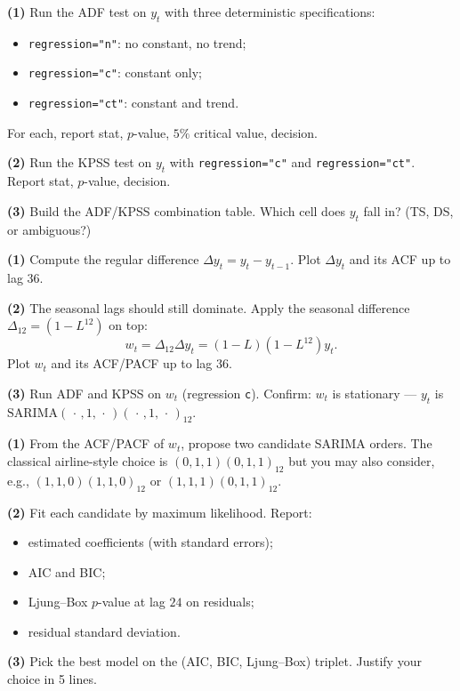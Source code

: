 \documentclass[a4paper,11pt]{article}
\begin{document}
\begin{exercise}
\textbf{(1)} Run the ADF test on $y_t$ with three deterministic
specifications:
\begin{itemize}
  \item \texttt{regression="n"}: no constant, no trend;
  \item \texttt{regression="c"}: constant only;
  \item \texttt{regression="ct"}: constant and trend.
\end{itemize}
For each, report stat, $p$-value, $5\%$ critical value, decision.

\textbf{(2)} Run the KPSS test on $y_t$ with \texttt{regression="c"}
and \texttt{regression="ct"}. Report stat, $p$-value, decision.

\textbf{(3)} Build the ADF/KPSS combination table. Which cell does
$y_t$ fall in? (TS, DS, or ambiguous?)
\end{exercise}

\begin{exercise}[Differencing]
\textbf{(1)} Compute the regular difference $\Delta y_t = y_t -
y_{t-1}$. Plot $\Delta y_t$ and its ACF up to lag $36$.

\textbf{(2)} The seasonal lags should still dominate. Apply the
seasonal difference $\Delta_{12} = (1 - L^{12})$ on top:
\[
  w_t = \Delta_{12} \Delta y_t = (1 - L)(1 - L^{12}) y_t.
\]
Plot $w_t$ and its ACF/PACF up to lag $36$.

\textbf{(3)} Run ADF and KPSS on $w_t$ (regression \texttt{c}).
Confirm: $w_t$ is stationary --- $y_t$ is $\text{SARIMA}(\,\cdot\,,1,\,\cdot\,)
(\,\cdot\,,1,\,\cdot\,)_{12}$.
\end{exercise}

\begin{exercise}
\textbf{(1)} From the ACF/PACF of $w_t$, propose two candidate
SARIMA orders. The classical airline-style choice is
$(0,1,1)(0,1,1)_{12}$ but you may also consider, e.g.,
$(1,1,0)(1,1,0)_{12}$ or $(1,1,1)(0,1,1)_{12}$.

\textbf{(2)} Fit each candidate by maximum likelihood. Report:
\begin{itemize}
  \item estimated coefficients (with standard errors);
  \item AIC and BIC;
  \item Ljung--Box $p$-value at lag $24$ on residuals;
  \item residual standard deviation.
\end{itemize}

\textbf{(3)} Pick the best model on the (AIC, BIC, Ljung--Box) triplet.
Justify your choice in 5 lines.
\end{exercise}
\end{document}
